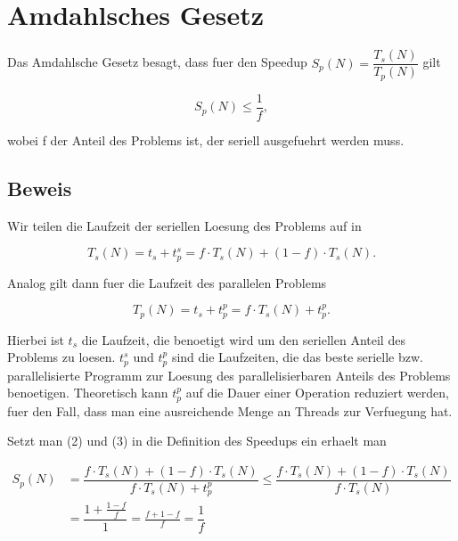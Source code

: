 \documentclass[10pt,a4paper]{article}
\begin{document}
\section{Amdahlsches Gesetz}

Das Amdahlsche Gesetz besagt, dass fuer den Speedup $S_p(N) = \dfrac{T_s(N)}{T_p(N)}$
gilt

\begin{equation}
	S_p(N) \leq \frac{1}{f},
\end{equation}

wobei f der Anteil des Problems ist, der seriell ausgefuehrt werden muss.

\subsection{Beweis}

Wir teilen die Laufzeit der seriellen Loesung des Problems auf in

\begin{equation}
	T_s(N) = t_s + t^s_p = f \cdot T_s(N) + (1-f) \cdot T_s(N).
\end{equation}

Analog gilt dann fuer die Laufzeit des parallelen Problems

\begin{equation}
	T_p(N) = t_s + t^p_p = f \cdot T_s(N) + t^p_p.
\end{equation}

Hierbei ist $t_s$ die Laufzeit, die benoetigt wird um den seriellen Anteil des
Problems zu loesen. $t^s_p$ und $t^p_p$ sind die Laufzeiten, die das beste serielle bzw.
parallelisierte Programm zur Loesung des parallelisierbaren Anteils des Problems benoetigen.
Theoretisch kann $t^p_p$ auf die Dauer einer Operation reduziert werden, fuer den Fall,
dass man eine ausreichende Menge an Threads zur Verfuegung hat.

Setzt man (2) und (3) in die Definition des Speedups ein erhaelt man

\begin{align*}
	S_p(N) &= \dfrac{f \cdot T_s(N) + (1-f) \cdot T_s(N)}{f \cdot T_s(N) + t^p_p} \leq \dfrac{f \cdot T_s(N) + (1-f) \cdot T_s(N)}{f \cdot T_s(N)} \\
				 &= \dfrac{1 + \frac{1-f}{f}}{1} = \frac{f+1-f}{f} = \dfrac{1}{f}
\end{align*}
\end{document}
